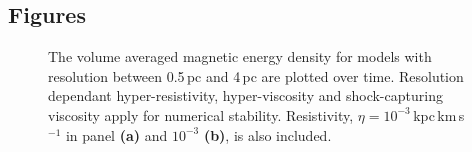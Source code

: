 \documentclass[preprint2]{aastex63}
\newcommand\aastex{AAS\TeX}
\begin{document}

\subsection{Figures\label{subsec:figures}}

\begin{figure}[ht!]
\caption{
The volume averaged magnetic energy density for models with resolution
between 0.5\,pc and 4\,pc are plotted over time.
Resolution dependant hyper-resistivity, hyper-viscosity and shock-capturing
viscosity apply for numerical stability.
Resistivity, $\eta=10^{-3}$\,kpc\,km\,s$^{-1}$ in panel {\bf(a)} and $10^{-3}$
{\bf(b)}, is also included.
\label{fig:eb-res}}
\end{figure}
\end{document}
